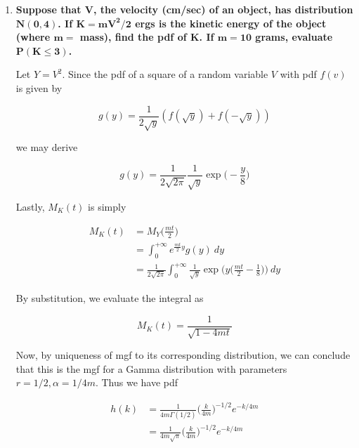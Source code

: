 \documentclass[10pt, oneside]{article}
\begin{document}
\begin{enumerate}[label=10.\arabic*]
\begin{proof}
Deriving the first and second moments yields

\begin{align*}
M'_X(t) &= n(1-2t)^{-n/2 - 1} \\
M'_X(0) &= \boxed{E[X] = n} \\
M''_X(t) &= n(n+2) (1-2t)^{-n/2 - 2} \\
M''_X(0) &= E[X^2] = n(n+2) \\
V[X] = E[X^2] - E[X]^2 &= \boxed{2n}
\end{align*}

\end{proof}

\item  \begin{tcolorbox}[
  colback=Cerulean!5!white,
  colframe=Cerulean!75!black]
\textbf{Suppose that $\bm{V}$, the velocity (cm/sec) of an object, has distribution $\bm{N(0,4)}$. If $\bm{K = mV^2/2}$ ergs is the kinetic energy of the object (where $\bm{m=}$ mass), find the pdf of $\bm{K}$. If $\bm{m=10}$ grams, evaluate $\bm{P(K \leq 3)}$.}
\end{tcolorbox}

Let $Y = V^2$. Since the pdf of a square of a random variable $V$ with pdf $f(v)$ is given by

\[ g(y) = \frac{1}{2\sqrt{y}} (f(\sqrt{y}) + f(-\sqrt{y})) \]

we may derive

\[ g(y) = \frac{1}{2\sqrt{2\pi}} \frac{1}{\sqrt{y}} \exp \bigg( -\frac{y}{8} \bigg) \]

Lastly, $M_K(t)$ is simply

\begin{align*}
M_K(t) &= M_Y \bigg( \frac{mt}{2} \bigg) \\
&= \int^{+\infty}_0 e^{\frac{mt}{2}y} g(y) \ dy \\
&= \frac{1}{2\sqrt{2\pi}} \int^{+\infty}_0 \frac{1}{\sqrt{y}} \exp \bigg( y \bigg( \frac{mt}{2} - \frac{1}{8} \bigg) \bigg) \ dy
\end{align*}

By substitution, we evaluate the integral as 

\[ M_K(t) = \frac{1}{\sqrt{1-4mt}} \]

Now, by uniqueness of mgf to its corresponding distribution, we can conclude that this is the mgf for a Gamma distribution with parameters $r = 1/2, \alpha = 1/4m$. Thus we have pdf

\begin{align*}
h(k) &= \frac{1}{4m \Gamma(1/2)} \bigg( \frac{k}{4m} \bigg)^{-1/2} e^{-k/4m} \\
&= \boxed{ \frac{1}{4m \sqrt{\pi}} \bigg( \frac{k}{4m} \bigg)^{-1/2} e^{-k/4m} }
\end{align*}


\end{enumerate}
\end{document}
